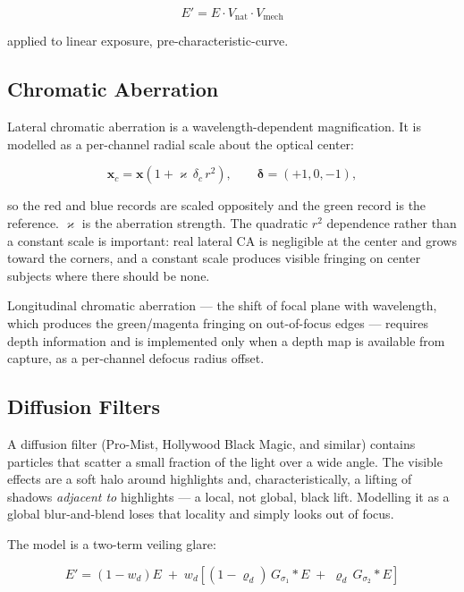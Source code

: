 \begin{equation}
\boxed{\;E' = E \cdot V_{\mathrm{nat}}\cdot V_{\mathrm{mech}}\;}
\label{eq:vignette}
\end{equation}

applied to linear exposure, pre-characteristic-curve.

\subsection{Chromatic Aberration}

Lateral chromatic aberration is a wavelength-dependent magnification. It is
modelled as a per-channel radial scale about the optical center:

\begin{equation}
\mathbf{x}_c = \mathbf{x}\left(1 + \varkappa\, \delta_c\, r^2\right),
\qquad \boldsymbol{\delta} = (+1, 0, -1),
\label{eq:ca}
\end{equation}

so the red and blue records are scaled oppositely and the green record is the
reference. $\varkappa$ is the aberration strength. The quadratic $r^2$
dependence rather than a constant scale is important: real lateral CA is
negligible at the center and grows toward the corners, and a constant scale
produces visible fringing on center subjects where there should be none.

Longitudinal chromatic aberration --- the shift of focal plane with wavelength,
which produces the green/magenta fringing on out-of-focus edges --- requires
depth information and is implemented only when a depth map is available from
capture, as a per-channel defocus radius offset.

\subsection{Diffusion Filters}

A diffusion filter (Pro-Mist, Hollywood Black Magic, and similar) contains
particles that scatter a small fraction of the light over a wide angle. The
visible effects are a soft halo around highlights and, characteristically, a
lifting of shadows \emph{adjacent to} highlights --- a local, not global, black
lift. Modelling it as a global blur-and-blend loses that locality and simply
looks out of focus.

The model is a two-term veiling glare:

\begin{equation}
\boxed{\;E' = (1 - w_d) E \;+\; w_d \left[(1-\varrho_d)\, G_{\sigma_1} * E \;+\; \varrho_d\, G_{\sigma_2} * E\right]\;}
\label{eq:diffusion}
\end{equation}

